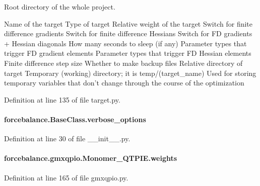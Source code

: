 Root directory of the whole project. 

Name of the target Type of target Relative weight of the target Switch for finite difference gradients Switch for finite difference Hessians Switch for F\-D gradients + Hessian diagonals How many seconds to sleep (if any) Parameter types that trigger F\-D gradient elements Parameter types that trigger F\-D Hessian elements Finite difference step size Whether to make backup files Relative directory of target Temporary (working) directory; it is temp/(target\-\_\-name) Used for storing temporary variables that don't change through the course of the optimization 

Definition at line 135 of file target.\-py.

\hypertarget{classforcebalance_1_1BaseClass_afd68efa29ccd2f320f4cf82198214aac}{
\paragraph[{verbose\-\_\-options}]{\setlength{\rightskip}{0pt plus 5cm}forcebalance.\-Base\-Class.\-verbose\-\_\-options\hspace{0.3cm}{\ttfamily [inherited]}}}\label{classforcebalance_1_1BaseClass_afd68efa29ccd2f320f4cf82198214aac}


Definition at line 30 of file \-\_\-\-\_\-init\-\_\-\-\_\-.\-py.

\hypertarget{classforcebalance_1_1gmxqpio_1_1Monomer__QTPIE_a4cbe02eccd28b60e657bbabc08ec25e0}{
\paragraph[{weights}]{\setlength{\rightskip}{0pt plus 5cm}forcebalance.\-gmxqpio.\-Monomer\-\_\-\-Q\-T\-P\-I\-E.\-weights}}\label{classforcebalance_1_1gmxqpio_1_1Monomer__QTPIE_a4cbe02eccd28b60e657bbabc08ec25e0}


Definition at line 165 of file gmxqpio.\-py.

